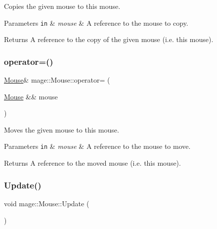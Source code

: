 Copies the given mouse to this mouse.


\begin{DoxyParams}[1]{Parameters}
\mbox{\tt in}  & {\em mouse} & A reference to the mouse to copy. \\
\hline
\end{DoxyParams}
\begin{DoxyReturn}{Returns}
A reference to the copy of the given mouse (i.\+e. this mouse). 
\end{DoxyReturn}
\hypertarget{classmage_1_1_mouse_a42d80f535a12356762a506438036dd71}{}\label{classmage_1_1_mouse_a42d80f535a12356762a506438036dd71} 
\subsubsection{\texorpdfstring{operator=()}{operator=()}\hspace{0.1cm}{\footnotesize\ttfamily [2/2]}}
{\footnotesize\ttfamily \hyperlink{classmage_1_1_mouse}{Mouse}\& mage\+::\+Mouse\+::operator= (\begin{DoxyParamCaption}\item[{\hyperlink{classmage_1_1_mouse}{Mouse} \&\&}]{mouse }\end{DoxyParamCaption})\hspace{0.3cm}{\ttfamily [delete]}}

Moves the given mouse to this mouse.


\begin{DoxyParams}[1]{Parameters}
\mbox{\tt in}  & {\em mouse} & A reference to the mouse to move. \\
\hline
\end{DoxyParams}
\begin{DoxyReturn}{Returns}
A reference to the moved mouse (i.\+e. this mouse). 
\end{DoxyReturn}
\hypertarget{classmage_1_1_mouse_a0cddae3f871dd69c1ba6928dc6b1f985}{}\label{classmage_1_1_mouse_a0cddae3f871dd69c1ba6928dc6b1f985} 
\subsubsection{\texorpdfstring{Update()}{Update()}}
{\footnotesize\ttfamily void mage\+::\+Mouse\+::\+Update (\begin{DoxyParamCaption}{ }\end{DoxyParamCaption})}

